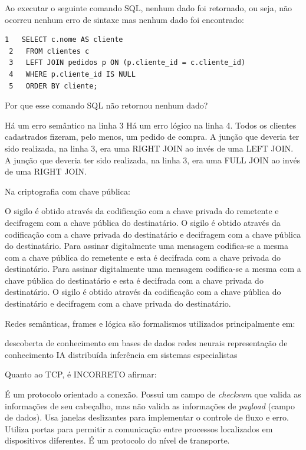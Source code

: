\documentclass[12pt, addpoints]{exam}
\begin{document}
\begin{questions}
\question
Ao executar o seguinte comando SQL, nenhum dado foi retornado, ou seja, não
ocorreu nenhum erro de sintaxe mas nenhum dado foi encontrado:
\begin{tcolorbox}
 \begin{verbatim}1   SELECT c.nome AS cliente
 2   FROM clientes c
 3   LEFT JOIN pedidos p ON (p.cliente_id = c.cliente_id)
 4   WHERE p.cliente_id IS NULL
 5   ORDER BY cliente;
 \end{verbatim}
\end{tcolorbox}
Por que esse comando SQL não retornou nenhum dado?

\begin{choices}
\choice Há um erro semântico na linha 3
\choice Há um erro lógico na linha 4.
\choice Todos os clientes cadastrados fizeram, pelo menos, um pedido de compra.
\choice A junção que deveria ter sido realizada, na linha 3, era uma RIGHT JOIN ao invés de uma LEFT JOIN.
\choice A junção que deveria ter sido realizada, na linha 3, era uma FULL JOIN ao invés de uma RIGHT JOIN.
\end{choices}

\question
Na criptografia com chave pública:

\begin{choices}
\choice O sigilo é obtido através da codificação com a chave privada do remetente e decifragem com a chave pública do destinatário.
\choice O sigilo é obtido através da codificação com a chave privada do destinatário e decifragem com a chave pública do destinatário.
\choice Para assinar digitalmente uma mensagem codifica-se a mesma com a chave pública do remetente e esta é decifrada com a chave privada do destinatário.
\choice Para assinar digitalmente uma mensagem codifica-se a mesma com a chave pública do destinatário e esta é decifrada com a chave privada do destinatário.
\choice O sigilo é obtido através da codificação com a chave pública do destinatário e decifragem com a chave privada do destinatário.
\end{choices}

\question
Redes semânticas, frames e lógica são formalismos utilizados principalmente em: 
\begin{choices}
\choice descoberta de conhecimento em bases de dados
\choice redes neurais
\choice representação de conhecimento
\choice IA distribuída
\choice inferência em sistemas especialistas
\end{choices}

\question
Quanto ao TCP, é INCORRETO afirmar:
\begin{choices}
\choice É um protocolo orientado a conexão.
\choice Possui um campo de \textit{checksum} que valida as informações de seu cabeçalho, mas não valida as informações de \textit{payload} (campo de dados).
\choice Usa janelas deslizantes para implementar o controle de fluxo e erro.
\choice Utiliza portas para permitir a comunicação entre processos localizados em dispositivos diferentes.
\choice É um protocolo do nível de transporte.
\end{choices}


\end{questions}
\end{document}
